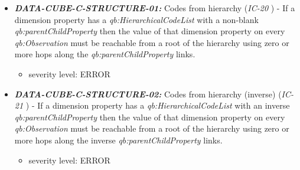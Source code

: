 \documentclass{llncs}
\begin{document}
\begin{itemize}
	\item \textbf{{\em DATA-CUBE-C-STRUCTURE-01:}}
	Codes from hierarchy (\emph{IC-20} \cite{CyganiakReynolds2014}) -  
	If a dimension property has a \emph{qb:HierarchicalCodeList} with a non-blank \emph{qb:parentChildProperty} then the value of that dimension property on every \emph{qb:Observation} must be reachable from a root of the hierarchy using zero or more hops along the \emph{qb:parentChildProperty} links. 
	\begin{itemize}
		\item severity level: ERROR
	\end{itemize}
	\item \textbf{{\em DATA-CUBE-C-STRUCTURE-02:}}
	Codes from hierarchy (inverse) (\emph{IC-21} \cite{CyganiakReynolds2014}) -  
	If a dimension property has a \emph{qb:HierarchicalCodeList} with an inverse \emph{qb:parentChildProperty} then the value of that dimension property on every \emph{qb:Observation} must be reachable from a root of the hierarchy using zero or more hops along the inverse \emph{qb:parentChildProperty} links. 
	\begin{itemize}
		\item severity level: ERROR
	\end{itemize}
\end{itemize}
\end{document}
